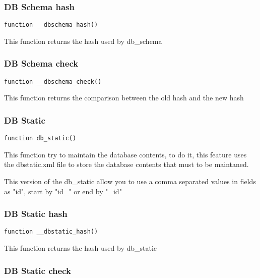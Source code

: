 \documentclass[a4paper]{article}
\begin{document}
\hypertarget{toc409}{}
\subsubsection{DB Schema hash}

\begin{lstlisting}
function __dbschema_hash()
\end{lstlisting}

This function returns the hash used by db\_schema

\hypertarget{toc410}{}
\subsubsection{DB Schema check}

\begin{lstlisting}
function __dbschema_check()
\end{lstlisting}

This function returns the comparison between the old hash and the new hash

\hypertarget{toc411}{}
\subsubsection{DB Static}

\begin{lstlisting}
function db_static()
\end{lstlisting}

This function try to maintain the database contents, to do it, this feature
uses the dbstatic.xml file to store the database contents that must to be
maintaned.

This version of the db\_static allow you to use a comma separated values in
fields as "id", start by "id\_" or end by "\_id"

\hypertarget{toc412}{}
\subsubsection{DB Static hash}

\begin{lstlisting}
function __dbstatic_hash()
\end{lstlisting}

This function returns the hash used by db\_static

\hypertarget{toc413}{}
\subsubsection{DB Static check}
\end{document}
